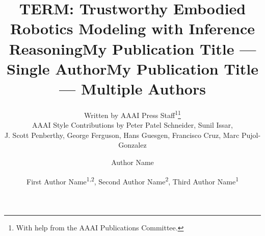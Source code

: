 \documentclass[letterpaper]{article} %
\title{TERM: Trustworthy Embodied Robotics Modeling with Inference Reasoning}
\author{
    Written by AAAI Press Staff\textsuperscript{\rm 1}\thanks{With help from the AAAI Publications Committee.}\\
    AAAI Style Contributions by Peter Patel Schneider,
    Sunil Issar,\\
    J. Scott Penberthy,
    George Ferguson,
    Hans Guesgen,
    Francisco Cruz\equalcontrib\corresponding,
    Marc Pujol-Gonzalez\equalcontrib\corresponding
}
\title{My Publication Title --- Single Author}
\author {
    Author Name
}
\title{My Publication Title --- Multiple Authors}
\author {
    First Author Name\textsuperscript{\rm 1,\rm 2}\equalcontrib,
    Second Author Name\textsuperscript{\rm 2}\equalcontrib,
    Third Author Name\textsuperscript{\rm 1}\corresponding
}
\begin{document}
\maketitle

\begin{abstract}



\end{abstract}
\end{document}
